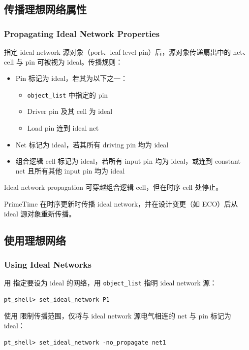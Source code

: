 \subsection{传播理想网络属性}
\subsubsection*{Propagating Ideal Network Properties}

指定 ideal network 源对象（port、leaf-level pin）后，源对象传递扇出中的 net、cell 与 pin 可被视为 ideal。传播规则：
\begin{itemize}
  \item Pin 标记为 ideal，若其为以下之一：
  \begin{itemize}
    \item {} \texttt{object\_list} 中指定的 pin
    \item Driver pin 及其 cell 为 ideal
    \item Load pin 连到 ideal net
  \end{itemize}
  \item Net 标记为 ideal，若其所有 driving pin 均为 ideal
  \item 组合逻辑 cell 标记为 ideal，若所有 input pin 均为 ideal，或连到 constant net 且所有其他 input pin 均为 ideal
\end{itemize}

\begin{noteBox}
Ideal network propagation 可穿越组合逻辑 cell，但在时序 cell 处停止。
\end{noteBox}

PrimeTime 在时序更新时传播 ideal network，并在设计变更（如 ECO）后从 ideal 源对象重新传播。

\subsection{使用理想网络}
\subsubsection*{Using Ideal Networks}

用  指定要设为 ideal 的网络，用 \texttt{object\_list} 指明 ideal network 源：
\begin{lstlisting}
pt_shell> set_ideal_network P1
\end{lstlisting}

使用  限制传播范围，仅将与 ideal network 源电气相连的 net 与 pin 标记为 ideal：
\begin{lstlisting}
pt_shell> set_ideal_network -no_propagate net1
\end{lstlisting}


